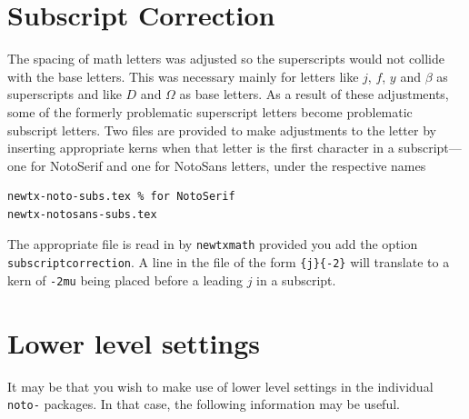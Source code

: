 \documentclass[]{article}
\begin{document}
\section*{Subscript Correction}
The spacing of math letters was adjusted so the superscripts would not collide with the base letters. This was necessary mainly for letters like $j$, $f$, $y$ and $\beta$ as superscripts and like $D$ and $\Omega$ as base letters. As a result of these adjustments, some of the formerly problematic superscript letters become problematic subscript letters. Two files are provided to make adjustments to the letter by inserting appropriate kerns when that letter is the first character in a subscript---one for NotoSerif and one for NotoSans letters, under the respective names 
\begin{verbatim}
newtx-noto-subs.tex % for NotoSerif
newtx-notosans-subs.tex
\end{verbatim}
The appropriate file is read in by {\tt newtxmath} provided you add the option {\tt subscriptcorrection}. A line in the file of the form \verb|{j}{-2}| will translate to a kern of {\tt -2mu} being placed before a leading $j$ in a subscript. 

\section*{Lower level settings}
It may be that you wish to make use of lower level settings in the individual {\tt noto-} packages. In that case, the following information may be useful.
\end{document}
